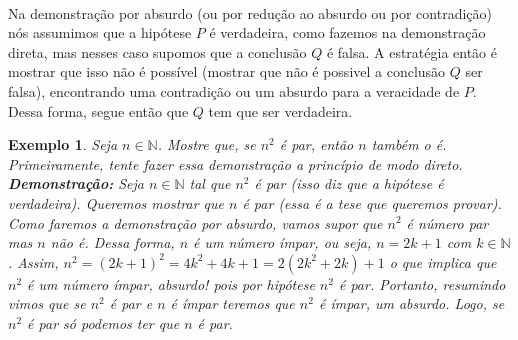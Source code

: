 \documentclass[10pt]{article}
\newtheorem{exemplo}{Exemplo}
\begin{document}
\\
Na demonstração por absurdo (ou por redução ao absurdo ou por contradição) nós assumimos que a hipótese $P$ é verdadeira, como fazemos na demonstração direta, mas nesses caso supomos que a conclusão $Q$ é falsa. A estratégia então é mostrar que isso não é possível (mostrar que não é possivel a conclusão $Q$ ser falsa), encontrando uma contradição ou um absurdo para a veracidade de $P$. Dessa forma, segue então que $Q$ tem que ser verdadeira.
\begin{exemplo}Seja $n\in \mathbb{N}$. Mostre que, se $n^2$ é par, então $n$ também o é.\\
\noindent Primeiramente, tente fazer essa demonstração a princípio de modo direto.\\
{\bf Demonstração:} Seja $n\in \mathbb{N}$ tal que $n^2$ é par (isso diz que a hipótese é verdadeira). Queremos mostrar que $n$ é par (essa é a tese que queremos provar). Como faremos a demonstração por absurdo, vamos supor que $n^2$ é número par mas $n$ não é. Dessa forma, $n$ é um número ímpar, ou seja, $n=2k+1$ com $k\in\mathbb{N}$. Assim, $n^2=(2k+1)^2= 4k^2+4k+1=2(2k^2+2k)+1$ o que implica que $n^2$ é um número \'impar, absurdo! pois por hipótese $n^2$ é par. Portanto, resumindo vimos que se $n^2$ é par e $n$ é ímpar teremos que $n^2$ é ímpar, um absurdo. Logo, se $n^2$ é par só podemos ter que $n$ é par.
\end{exemplo}
\end{document}
